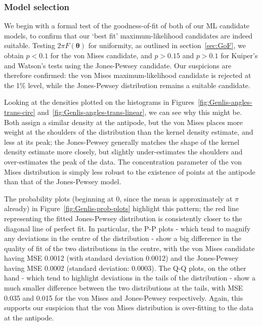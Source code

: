 \documentclass[../../ArchStats.tex]{subfiles}
\begin{document}
\subsubsection{Model selection}

We begin with a formal test of the goodness-of-fit of both of our ML candidate models, to confirm that our `best fit' maximum-likelihood candidates are indeed suitable. Testing $2\pi F(\boldsymbol{\theta})$ for uniformity, as outlined in section~\ref{sec:GoF}, we obtain $p < 0.1$ for the von Mises candidate, and $p > 0.15$ and $p>0.1$ for Kuiper's and Watson's tests using the Jones-Pewsey candidate. Our suspicions are therefore confirmed: the von Mises maximum-likelihood candidate is rejected at the 1\% level, while the Jones-Pewsey distribution remains a suitable candidate.

Looking at the densities plotted on the histograms in Figures~\ref{fig:Genlis-angles-trans-circ} and~\ref{fig:Genlis-angles-trans-linear}, we can see why this might be. Both assign a similar density at the antipode, but the von Mises places more weight at the shoulders of the distribution than the kernel density estimate, and less at its peak; the Jones-Pewsey generally matches the shape of the kernel density estimate more closely, but slightly under-estimates the shoulders and over-estimates the peak of the data. The concentration parameter of the von Mises distribution is simply less robust to the existence of points at the antipode than that of the Jones-Pewsey model.

The probability plots (beginning at 0, since the mean is approximately at $\pi$ already) in Figure~\ref{fig:Genlis-prob-plots} highlight this pattern; the red line representing the fitted Jones-Pewsey distribution is consistently closer to the diagonal line of perfect fit. In particular, the P-P plots - which tend to magnify any deviations in the centre of the distribution - show a big difference in the quality of fit of the two distributions in the centre, with the von Mises candidate having MSE 0.0012 (with standard deviation 0.0012) and the Jones-Pewsey having MSE 0.0002 (standard deviation: 0.0003). The Q-Q plots, on the other hand - which tend to highlight deviations in the tails of the distribution - show a much smaller difference between the two distributions at the tails, with MSE 0.035 and 0.015 for the von Mises and Jones-Pewsey respectively. Again, this supports our suspicion that the von Mises distribution is over-fitting to the data at the antipode.
\end{document}

